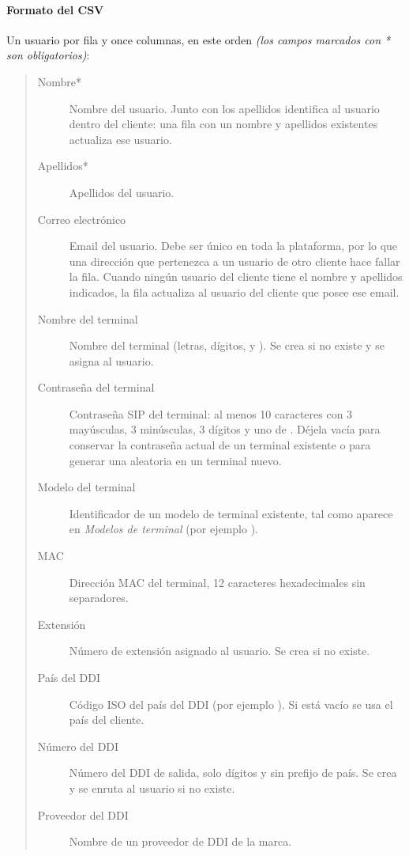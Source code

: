 \documentclass[letterpaper,10pt,spanish]{sphinxmanual}
\begin{document}
\paragraph{Formato del CSV}
\label{administration_portal/brand/clients/virtual_pbx:csv-format}
Un usuario por fila y once columnas, en este orden \emph{(los campos marcados con * son obligatorios)}:
\begin{quote}
\begin{description}
\item[{Nombre*}] \leavevmode
Nombre del usuario. Junto con los apellidos identifica al usuario dentro del cliente: una fila con un nombre y apellidos existentes actualiza ese usuario.

\item[{Apellidos*}] \leavevmode
Apellidos del usuario.

\item[{Correo electrónico}] \leavevmode
Email del usuario. Debe ser único en toda la plataforma, por lo que una dirección que pertenezca a un usuario de otro cliente hace fallar la fila. Cuando ningún usuario del cliente tiene el nombre y apellidos indicados, la fila actualiza al usuario del cliente que posee ese email.

\item[{Nombre del terminal}] \leavevmode
Nombre del terminal (letras, dígitos, \sphinxcode{\_} y \sphinxcode{*}). Se crea si no existe y se asigna al usuario.

\item[{Contraseña del terminal}] \leavevmode
Contraseña SIP del terminal: al menos 10 caracteres con 3 mayúsculas, 3 minúsculas, 3 dígitos y uno de \sphinxcode{+ * \_ -}. Déjela vacía para conservar la contraseña actual de un terminal existente o para generar una aleatoria en un terminal nuevo.

\item[{Modelo del terminal}] \leavevmode
Identificador de un modelo de terminal existente, tal como aparece en \emph{Modelos de terminal} (por ejemplo ).

\item[{MAC}] \leavevmode
Dirección MAC del terminal, 12 caracteres hexadecimales sin separadores.

\item[{Extensión}] \leavevmode
Número de extensión asignado al usuario. Se crea si no existe.

\item[{País del DDI}] \leavevmode
Código ISO del país del DDI (por ejemplo ). Si está vacío se usa el país del cliente.

\item[{Número del DDI}] \leavevmode
Número del DDI de salida, solo dígitos y sin prefijo de país. Se crea y se enruta al usuario si no existe.

\item[{Proveedor del DDI}] \leavevmode
Nombre de un proveedor de DDI de la marca.

\end{description}
\end{quote}
\end{document}
